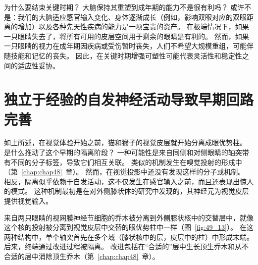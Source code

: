 为什么要结束关键时期？
大脑保持其重塑到成年期的能力不是很有利吗？
或许不是：我们的大脑适应感官输入变化、身体逐渐成长（例如，影响双眼对应的双眼距离的增加）以及各种先天性疾病的能力是一项宝贵的资产。
在极端情况下，如果一只眼睛失去了，将所有可用的皮层空间用于剩余的眼睛是有利的。
然而，如果一只眼睛的视力在成年期因疾病或受伤暂时丧失，人们不希望大规模重组，可能伴随技能和记忆的丧失。
因此，在关键时期增强可塑性可能代表灵活性和稳定性之间的适应性妥协。



\section{独立于经验的自发神经活动导致早期回路完善}

如上所述，在视觉体验开始之前，猫和猴子的视觉皮层就开始分离成眼优势柱。
是什么推动了这个早期的隔离阶段？
一种可能性是来自同侧和对侧眼睛的轴突带有不同的分子标签，导致它们相互关联。
类似的机制发生在嗅觉投射的形成中（第~\ref{chap:chap48}~章）。
然而，在视觉投影中还没有发现这样的分子或机制。
相反，隔离似乎依赖于自发活动，这不仅发生在感官输入之前，而且还表现出惊人的模式。
这种机制最初是在对外侧膝状体的研究中发现的，其神经元为视觉皮层提供视觉输入。


来自两只眼睛的视网膜神经节细胞的乔木被分离到外侧膝状核中的交替层中，就像这个核的投射被分离到视觉皮层中交替的眼优势柱中一样（图~\ref{fig:49_13}）。 
在这两种结构中，单个轴突首先在多个域（膝状核中的层，皮层中的柱）中形成末端。
后来，终端通过改进过程被隔离。
改进包括在“合适的”层中生长顶生乔木和从不合适的层中消除顶生乔木（第~\ref{chap:chap48}~章）。


